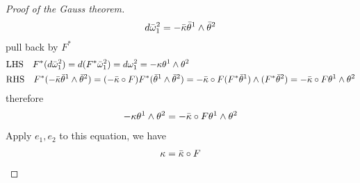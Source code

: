 \documentclass[10pt]{article}
\begin{document}
            \begin{proof}[Proof of the Gauss theorem]
                \begin{equation*}
                    \begin{aligned}
                        d\Bar{\omega}_1^2 = -\Bar{\kappa}\Bar{\theta}^1\wedge\Bar{\theta}^2
                    \end{aligned}
                \end{equation*}
                pull back by $F^*$
                \begin{equation*}
                    \begin{aligned}
                        &\text{LHS}\quad F^*(d\Bar{\omega}_1^2) = d(F^*\Bar{\omega}_1^2) = d\omega_1^2 = -\kappa\theta^1\wedge\theta^2 \\
                        &\text{RHS}\quad F^*(-\Bar{\kappa}\Bar{\theta}^1\wedge\Bar{\theta}^2) = (-\Bar{\kappa}\circ F) F^*(\Bar{\theta}^1\wedge\Bar{\theta}^2) = -\Bar{\kappa}\circ F (F^*\Bar{\theta}^1)\wedge(F^*\Bar{\theta}^2) = -\Bar{\kappa}\circ F \theta^1\wedge\theta^2
                    \end{aligned}
                \end{equation*}
                therefore
                \begin{equation*}
                    \begin{aligned}
                        -\kappa\theta^1\wedge\theta^2 = -\Bar{\kappa}\circ F \theta^1\wedge\theta^2
                    \end{aligned}
                \end{equation*}
                Apply $e_1,e_2$ to this equation, we have
                \begin{equation*}
                    \begin{aligned}
                        \kappa = \Bar{\kappa}\circ F
                    \end{aligned}
                \end{equation*}
            \end{proof}
\end{document}
